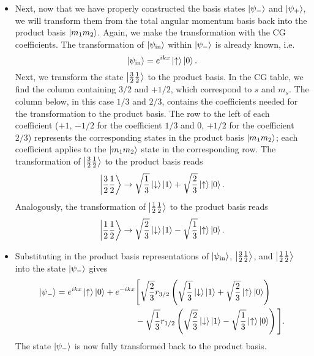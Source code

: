 \documentclass[11pt, a4paper]{article}
\newcommand{\p}{\psi}  %
\newcommand{\ua}{\uparrow}  %
\newcommand{\da}{\downarrow}  %
\begin{document}
\begin{itemize}
	\item Next, now that we have properly constructed the basis states $ \ket{\p_{-}} $ and $ \ket{\p_{+}} $, we will transform them from the total angular momentum basis back into the product basis $ \ket{m_{1}m_{2}} $. Again, we make the transformation with the CG coefficients. The transformation of $ \ket{\p_{\text{in}}} $ within $ \ket{\p_{-}} $ is already known, i.e.
	\begin{equation*}
		\ket{\p_{\text{in}}} = e^{ikx}\ket{\ua}\ket{0}.
	\end{equation*}
	Next, we transform the state $ \ket{\frac{3}{2}\frac{1}{2}} $ to the product basis. In the CG table, we find the column containing $ 3/2 $ and $ +1/2 $, which correspond to $ s $ and $ m_{s} $. The column below, in this case $ 1/3 $ and $ 2/3 $, contains the coefficients needed for the transformation to the product basis. The row to the left of each coefficient ($ +1 $, $ -1/2 $ for the coefficient $ 1/3 $ and $ 0 $, $ +1/2 $ for the coefficient $ 2/3 $) represents the corresponding states in the product basis $ \ket{m_{1}m_{2}} $; each coefficient applies to the $ \ket{m_{1}m_{2}} $ state in the corresponding row. The transformation of $ \ket{\frac{3}{2}\frac{1}{2}} $ to the product basis reads
	\begin{equation*}
		\ket{\frac{3}{2}\frac{1}{2}}  \to \sqrt{\frac{1}{3}}\ket{\da}\ket{1} +  \sqrt{\frac{2}{3}}\ket{\ua}\ket{0}.
	\end{equation*}
	Analogously, the transformation of $ \ket{\frac{1}{2}\frac{1}{2}} $ to the product basis reads
	\begin{equation*}
		\ket{\frac{1}{2}\frac{1}{2}}  \to \sqrt{\frac{2}{3}}\ket{\da}\ket{1} - \sqrt{\frac{1}{3}}\ket{\ua}\ket{0}.
	\end{equation*}
	
	\item Substituting in the product basis representations of $ \ket{\psi_{\text{in}}} $, $ \ket{\frac{3}{2}\frac{1}{2}} $, and $ \ket{\frac{1}{2}\frac{1}{2}} $ into the state $ \ket{\psi_{-}} $ gives
	\begin{align*}
		\ket{\psi_{-}} = e^{ikx}\ket{\ua}\ket{0} + e^{-ikx} & \Bigg[\sqrt{\frac{2}{3}}r_{3/2}\left(\sqrt{\frac{1}{3}}\ket{\da}\ket{1} +  \sqrt{\frac{2}{3}}\ket{\ua}\ket{0}\right) \\
		& - \sqrt{\frac{1}{3}}r_{1/2}\left( \sqrt{\frac{2}{3}}\ket{\da}\ket{1} - \sqrt{\frac{1}{3}}\ket{\ua}\ket{0} \right)\Bigg].
	\end{align*}
	The state $ \ket{\psi_{-}}  $ is now fully transformed back to the product basis. 
	

\end{itemize}
\end{document}
